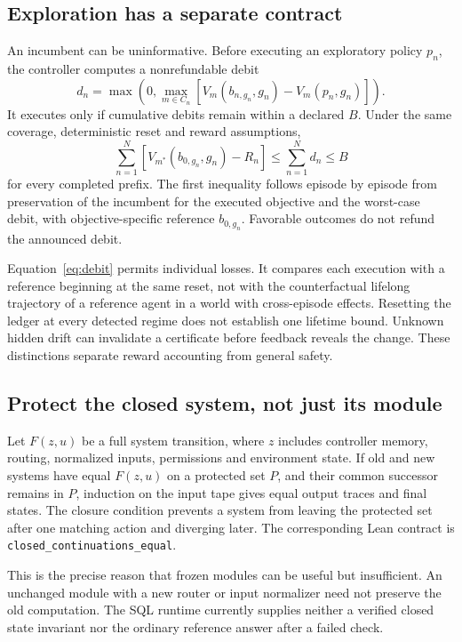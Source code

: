 \documentclass[10pt,twocolumn]{article}
\newcommand{\code}[1]{\texttt{\small #1}}
\begin{document}
\subsection{Exploration has a separate contract}
An incumbent can be uninformative. Before executing an exploratory policy
$p_n$, the controller computes a nonrefundable debit
\begin{equation}
 d_n=\max\!\left(0,\max_{m\in C_n}
       [V_m(b_{n,g_n},g_n)-V_m(p_n,g_n)]\right).
\end{equation}
It executes only if cumulative debits remain within a declared $B$. Under the
same coverage, deterministic reset and reward assumptions,
\begin{equation}\label{eq:debit}
 \sum_{n=1}^N[V_{m^*}(b_{0,g_n},g_n)-R_n]
 \leq\sum_{n=1}^N d_n\leq B
\end{equation}
for every completed prefix. The first inequality follows episode by episode
from preservation of the incumbent for the executed objective and the worst-case
debit, with objective-specific reference $b_{0,g_n}$. Favorable outcomes
do not refund the announced debit.

Equation~\eqref{eq:debit} permits individual losses. It compares each execution
with a reference beginning at the same reset, not with the counterfactual
lifelong trajectory of a reference agent in a world with cross-episode effects.
Resetting the ledger at every detected regime does not establish one lifetime
bound. Unknown hidden drift can invalidate a certificate before feedback reveals
the change. These distinctions separate reward accounting from general safety.

\subsection{Protect the closed system, not just its module}
Let $F(z,u)$ be a full system transition, where $z$ includes controller memory,
routing, normalized inputs, permissions and environment state. If old and new
systems have equal $F(z,u)$ on a protected set $P$, and their common successor
remains in $P$, induction on the input tape gives equal output traces and final
states. The closure condition prevents a system from leaving the protected set
after one matching action and diverging later. The corresponding Lean contract
is \code{closed\_continuations\_equal}.

This is the precise reason that frozen modules can be useful but insufficient.
An unchanged module with a new router or input normalizer need not preserve the
old computation. The SQL runtime currently supplies neither a verified closed
state invariant nor the ordinary reference answer after a failed check.
\end{document}
